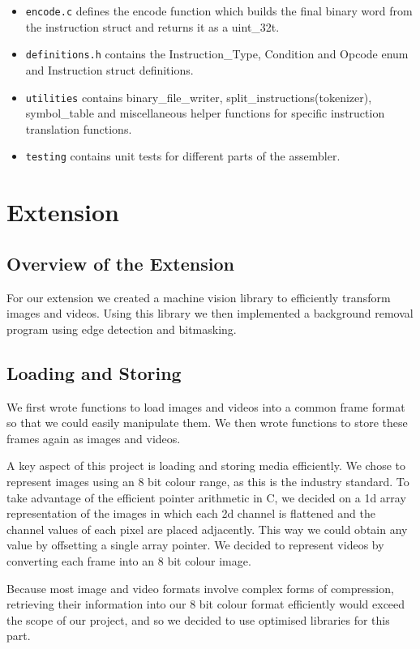 \documentclass[11pt]{article}
\begin{document}
\begin{itemize}
\item \texttt{encode.c} defines the encode function which builds the final binary word from the instruction struct and returns it as a uint\_32t.

\item \texttt{definitions.h} contains the Instruction\_Type, Condition and Opcode enum and Instruction struct definitions.

\item \texttt{utilities} contains binary\_file\_writer, split\_instructions(tokenizer), symbol\_table and miscellaneous helper functions for specific instruction translation functions.

\item \texttt{testing} contains unit tests for different parts of the assembler.

\end{itemize}


  \section*{Extension}

  \subsection*{Overview of the Extension}
  For our extension we created a machine vision library to efficiently transform images and videos. Using this library we then implemented a background removal program using edge detection and bitmasking.
  \subsection*{Loading and Storing}
  We first wrote functions to load images and videos into a common frame format so that we could easily manipulate them. We then wrote functions to store these frames again as images and videos.

%
A key aspect of this project is loading and storing media efficiently. We chose to represent images using an 8 bit colour range, as this is the industry standard. To take advantage of the efficient pointer arithmetic in C, we decided on a 1d array representation of the images in which each 2d channel is flattened and the channel values of each pixel are placed adjacently. This way we could obtain any value by offsetting a single array pointer. We decided to represent videos by converting each frame into an 8 bit colour image.

%
Because most image and video formats involve complex forms of compression, retrieving their information into our 8 bit colour format efficiently would exceed the scope of our project, and so we decided to use optimised libraries for this part.
\end{document}
